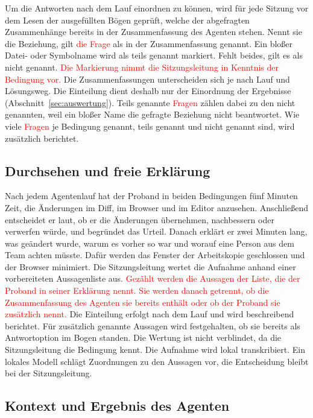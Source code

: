 Um die Antworten nach dem Lauf einordnen zu können, wird für jede Sitzung vor dem Lesen der ausgefüllten Bögen geprüft, welche der abgefragten Zusammenhänge bereits in der Zusammenfassung des Agenten stehen. Nennt sie die Beziehung, gilt \textcolor{red}{die Frage} als in der Zusammenfassung genannt. Ein bloßer Datei- oder Symbolname wird als teils genannt markiert. Fehlt beides, gilt es als nicht genannt. \textcolor{red}{Die Markierung nimmt die Sitzungsleitung in Kenntnis der Bedingung vor.} Die Zusammenfassungen unterscheiden sich je nach Lauf und Lösungsweg. Die Einteilung dient deshalb nur der Einordnung der Ergebnisse (Abschnitt~\ref{sec:auswertung}). Teils genannte \textcolor{red}{Fragen} zählen dabei zu den nicht genannten, weil ein bloßer Name die gefragte Beziehung nicht beantwortet. Wie viele \textcolor{red}{Fragen} je Bedingung genannt, teils genannt und nicht genannt sind, wird zusätzlich berichtet.

\subsection{Durchsehen und freie Erklärung}

Nach jedem Agentenlauf hat der Proband in beiden Bedingungen fünf Minuten Zeit, die Änderungen im Diff, im Browser und im Editor anzusehen. Anschließend entscheidet er laut, ob er die Änderungen übernehmen, nachbessern oder verwerfen würde, und begründet das Urteil. Danach erklärt er zwei Minuten lang, was geändert wurde, warum es vorher so war und worauf eine Person aus dem Team achten müsste. Dafür werden das Fenster der Arbeitskopie geschlossen und der Browser minimiert. Die Sitzungsleitung wertet die Aufnahme anhand einer vorbereiteten Aussagenliste aus. \textcolor{red}{Gezählt werden die Aussagen der Liste, die der Proband in seiner Erklärung nennt. Sie werden danach getrennt, ob die Zusammenfassung des Agenten sie bereits enthält oder ob der Proband sie zusätzlich nennt.} Die Einteilung erfolgt nach dem Lauf und wird beschreibend berichtet. Für zusätzlich genannte Aussagen wird festgehalten, ob sie bereits als Antwortoption im Bogen standen. Die Wertung ist nicht verblindet, da die Sitzungsleitung die Bedingung kennt. Die Aufnahme wird lokal transkribiert. Ein lokales Modell schlägt Zuordnungen zu den Aussagen vor, die Entscheidung bleibt bei der Sitzungsleitung.

\subsection{Kontext und Ergebnis des Agenten}

